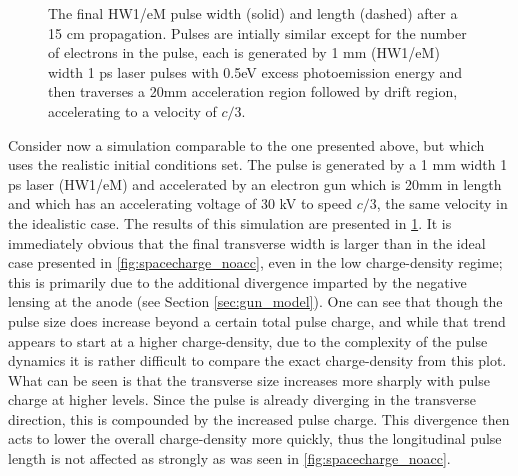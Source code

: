 \begin{figure}
  \centering
  \begin{tikzpicture}
    
  \end{tikzpicture}
  \caption[More realistic free-space pulse evolution vs charge density]{
    The final HW1/eM pulse width (solid) and length (dashed) after a 15 cm propagation. 
    Pulses are intially similar except for the number of electrons in the pulse, each is generated by 1 mm (HW1/eM) width 1 ps laser pulses with 0.5eV excess photoemission energy and then traverses a 20mm acceleration region followed by drift region, accelerating to a velocity of $c/3$.
  }
  \label{fig:spacecharge_acc}
\end{figure}

Consider now a simulation comparable to the one presented above, but which uses the realistic initial conditions set.
The pulse is generated by a 1 mm width 1 ps laser (HW1/eM) and accelerated by an electron gun which is 20mm in length and which has an accelerating voltage of 30 kV to speed $c/3$, the same velocity in the idealistic case.
The results of this simulation are presented in \ref{fig:spacecharge_acc}.
It is immediately obvious that the final transverse width is larger than in the ideal case presented in \ref{fig:spacecharge_noacc}, even in the low charge-density regime; this is primarily due to the additional divergence imparted by the negative lensing at the anode (see Section \ref{sec:gun_model}).
One can see that though the pulse size does increase beyond a certain total pulse charge, and while that trend appears to start at a higher charge-density, due to the complexity of the pulse dynamics it is rather difficult to compare the exact charge-density from this plot.
What can be seen is that the transverse size increases more sharply with pulse charge at higher levels.
Since the pulse is already diverging in the transverse direction, this is compounded by the increased pulse charge.
This divergence then acts to lower the overall charge-density more quickly, thus the longitudinal pulse length is not affected as strongly as was seen in \ref{fig:spacecharge_noacc}.


